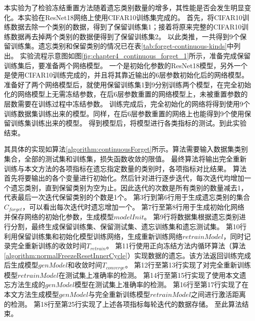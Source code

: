 本实验为了检验冻结重置方法随着遗忘类别数量的增多，其性能是否会发生明显变化。本实验在ResNet18网络上使用CIFAR10训练集完成的。
首先，将CIFAR10训练数据去除一个类别的数据，得到了保留训练集1；接着将原来完整的CIFAR10训练数据再去掉两个类别的数据便得到了保留训练集2。
以此类推，一共得到9个保留训练集。遗忘类别和保留类别的情况已在表\ref{tab:forget-continuous-kinds}中列出。
实验流程示意图如图\ref{fig:chapter4_continuous_forget_1}所示，准备完成保留训练集后，要准备两个网络模型。
一个是初始化参数的ResNet18模型，另外一个是使用CIFAR10训练完成的，并且将其靠近输出的6层参数初始化后的网络模型。
准备好了两个网络模型后，就使用保留训练集1到9分别训练两个模型，在完全初始化的网络模型上无需冻结参数，在后6层参数重置的网络模型上，未被重置参数的层数需要在训练过程中冻结参数。
训练完成后，完全初始化的网络将得到使用9个训练数据集训练出来的模型。同样，在后6层参数重置的网络上也能得到9个使用保留训练集训练出来的模型。
得到模型后，将模型进行各类指标的测试。到此实验结束。

其具体的实现如算法\ref{algorithm:continuousForget}所示。算法需要输入数据集类别集合，全部的测试集和训练集，损失函数收敛的限值。
最终算法将输出完全重新训练与本文方法的各项指标在遗忘指定数量的类别时，各项指标对比结果。
算法首先将要输出的各个变量进行初始化。然后针对进行逐步迭代，每次迭代均增加一个遗忘类别，直到保留类别为空为止。因此迭代的次数是所有类别的数量减去1，代表最后一次迭代保留类别的个数是1个。
第3行到第6行用于生成遗忘类别的集合$C_{forget}$，可以看出每次迭代时遗忘增加一个。
第7行至第8行用于生成初始化网络并保存网络的初始化参数，生成模型$modelInit$。
第9行将数据集根据遗忘类别进行分割，最终生成保留训练集、保留测试集、遗忘训练集和遗忘测试集。
第10行利用保留训练集和初始化模型训练网络，生成重新训练网络$retrainModel$，同时记录完全重新训练的收敛时间$T_{retrain}$。
第11行使用正向冻结方法内循环算法（算法\ref{algorithm:normalFreezeResetInnerCycle}）实现数据的遗忘。该方法返回训练完成后生成模型$genModel$和收敛时间$T_{converge}$。
第12行至第13行实现了对完全重新训练模型$retrainModel$在测试集上准确率的检测。
第14行至第15行实现了使用本文遗忘方法生成的$genModel$模型在测试集上准确率的检测。
第16行至第17行实现了在本文方法生成模型$genModel$与完全重新训练模型$retrainModel$之间进行激活距离的检测。
第18行至第25行实现了上述各项指标每轮迭代的数据存储。
至此算法结束。


